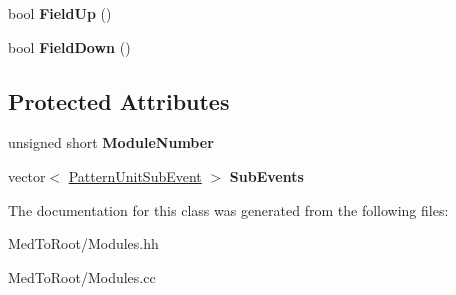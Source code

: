 \begin{DoxyCompactItemize}
\item 
\hypertarget{class_pattern_unit_a2613100013a287640343ed0a791efaff}{bool {\bfseries Field\-Up} ()}\label{class_pattern_unit_a2613100013a287640343ed0a791efaff}

\item 
\hypertarget{class_pattern_unit_abaae7087af48725d48c8231e81ac9c7d}{bool {\bfseries Field\-Down} ()}\label{class_pattern_unit_abaae7087af48725d48c8231e81ac9c7d}

\end{DoxyCompactItemize}
\subsection*{Protected Attributes}
\begin{DoxyCompactItemize}
\item 
\hypertarget{class_pattern_unit_a23d9e67b29f7a16af89cea12293f0d4b}{unsigned short {\bfseries Module\-Number}}\label{class_pattern_unit_a23d9e67b29f7a16af89cea12293f0d4b}

\item 
\hypertarget{class_pattern_unit_ac405794a8bdd20dc9dd249ee0251677c}{vector$<$ \hyperlink{class_pattern_unit_sub_event}{Pattern\-Unit\-Sub\-Event} $>$ {\bfseries Sub\-Events}}\label{class_pattern_unit_ac405794a8bdd20dc9dd249ee0251677c}

\end{DoxyCompactItemize}


The documentation for this class was generated from the following files\-:\begin{DoxyCompactItemize}
\item 
Med\-To\-Root/Modules.\-hh\item 
Med\-To\-Root/Modules.\-cc\end{DoxyCompactItemize}

